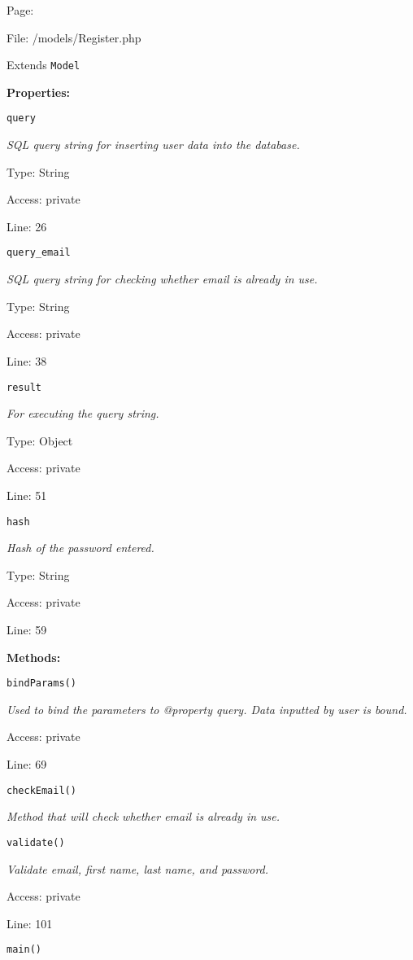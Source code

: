 Page: \pageref{Register.php}

File: /models/Register.php

Extends \texttt{Model}

\textbf{Properties:}

\texttt{query}

{\scriptsize
\textit{SQL query string for inserting user data into the database.}

Type: String

Access: private

Line: 26

}
\texttt{query\_email}

{\scriptsize
\textit{SQL query string for checking whether email is already in use.}

Type: String

Access: private

Line: 38

}
\texttt{result}

{\scriptsize
\textit{For executing the query string.}

Type: Object

Access: private

Line: 51

}
\texttt{hash}

{\scriptsize
\textit{Hash of the password entered.}

Type: String

Access: private

Line: 59

}
\textbf{Methods:}

\texttt{bindParams()}

{\scriptsize
\textit{Used to bind the parameters to @property query.
Data inputted by user is bound.}

Access: private

Line: 69

}

\texttt{checkEmail()}

{\scriptsize
\textit{Method that will check whether email is already in use.}

}

\texttt{validate()}

{\scriptsize
\textit{Validate email, first name, last name, and password.}

Access: private

Line: 101

}

\texttt{main()}

